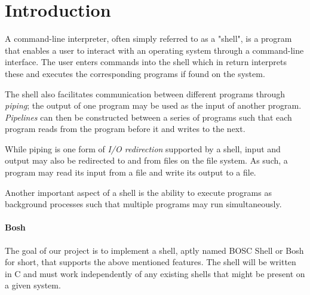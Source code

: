 \section{Introduction}
\label{sec:introduction}

A command-line interpreter, often simply referred to as a "shell", is a program that enables a user to interact with an operating system through a command-line interface. The user enters commands into the shell which in return interprets these and executes the corresponding programs if found on the system.

The shell also facilitates communication between different programs through \textit{piping}; the output of one program may be used as the input of another program. \textit{Pipelines} can then be constructed between a series of programs such that each program reads from the program before it and writes to the next.

While piping is one form of \textit{I/O redirection} supported by a shell, input and output may also be redirected to and from files on the file system. As such, a program may read its input from a file and write its output to a file.

Another important aspect of a shell is the ability to execute programs as background processes such that multiple programs may run simultaneously.

\paragraph{Bosh} The goal of our project is to implement a shell, aptly named BOSC Shell or Bosh for short, that supports the above mentioned features. The shell will be written in C and must work independently of any existing shells that might be present on a given system.
